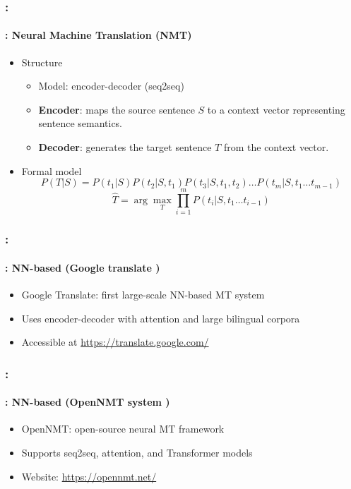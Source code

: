\documentclass[xcolor=table]{beamer}
\begin{document}
\begin{frame}
	\frametitle{\insertshortsubtitle: \insertsection}
	\framesubtitle{\insertsubsection: Neural Machine Translation (NMT)}
	
	\begin{itemize}
		\item Structure
		\begin{itemize}
			\item Model: encoder-decoder (seq2seq)
			\item \textbf{Encoder}: maps the source sentence $S$ to a context vector representing sentence semantics.
			\item \textbf{Decoder}: generates the target sentence $T$ from the context vector.
		\end{itemize}
		
		\item Formal model
		\[
		P(T|S) = P(t_1|S) P(t_2|S, t_1) P(t_3|S, t_1, t_2)\ldots P(t_m|S, t_1\ldots t_{m-1})
		\]
		\[
		\hat{T} = \arg\max_{T} \prod_{i=1}^{m} P(t_i | S, t_1\ldots t_{i-1})
		\]
	\end{itemize}
	
\end{frame}


\begin{frame}
	\frametitle{\insertshortsubtitle: \insertsection}
	\framesubtitle{\insertsubsection: NN-based (Google translate \cite{16-wu-al})}
	
	\begin{itemize}
		\item Google Translate: first large-scale NN-based MT system
		\item Uses encoder-decoder with attention and large bilingual corpora
		\item Accessible at \url{https://translate.google.com/}
	\end{itemize}
	
	\begin{center}
	\end{center}

\end{frame}

\begin{frame}
	\frametitle{\insertshortsubtitle: \insertsection}
	\framesubtitle{\insertsubsection: NN-based (OpenNMT system \cite{17-klein-al})}
	
	\begin{itemize}
		\item OpenNMT: open-source neural MT framework
		\item Supports seq2seq, attention, and Transformer models
		\item Website: \url{https://opennmt.net/}
	\end{itemize}
	
	\begin{center}
	\end{center}
	
\end{frame}
\end{document}
